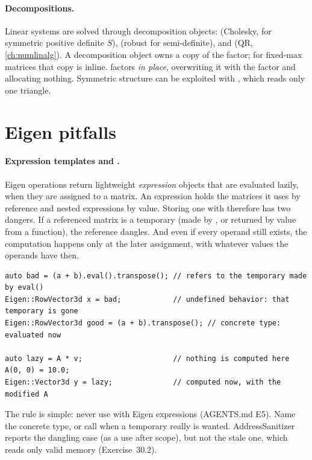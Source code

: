 \paragraph{Decompositions.} Linear systems are solved through decomposition objects:  (Cholesky, for symmetric positive definite
$S$),  (robust for semi-definite),  and  (QR, \cref{ch:numlinalg}). A decomposition object owns
a copy of the factor; for fixed-max matrices that copy is inline.  factors  \emph{in place},
overwriting it with the factor and allocating nothing. Symmetric structure can be exploited with , which reads
only one triangle.

\section{Eigen pitfalls}

\paragraph{Expression templates and .} Eigen operations return lightweight \emph{expression} objects that are evaluated
lazily, when they are assigned to a matrix. An expression holds the matrices it uses by reference and nested expressions by value. Storing one
with  therefore has two dangers. If a referenced matrix is a temporary (made by , or returned by value from a function),
the reference dangles. And even if every operand still exists, the computation happens only at the later assignment, with whatever values
the operands have then.

\begin{lstlisting}
auto bad = (a + b).eval().transpose(); // refers to the temporary made by eval()
Eigen::RowVector3d x = bad;            // undefined behavior: that temporary is gone
Eigen::RowVector3d good = (a + b).transpose(); // concrete type: evaluated now

auto lazy = A * v;                     // nothing is computed here
A(0, 0) = 10.0;
Eigen::Vector3d y = lazy;              // computed now, with the modified A
\end{lstlisting}

The rule is simple: never use  with Eigen expressions (AGENTS.md E5). Name the concrete type, or call  when a
temporary really is wanted. AddressSanitizer reports the dangling case (as a use after scope), but not the stale one, which reads only valid
memory (Exercise~30.2).

